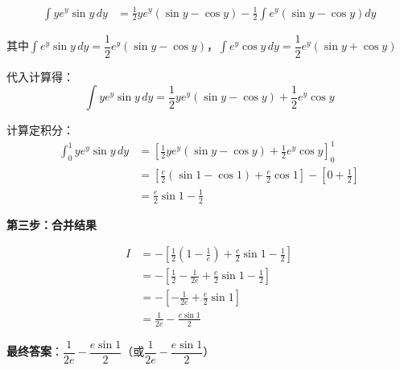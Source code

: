 \documentclass[standard]{ExBook}
\begin{document}
\begin{qitems}
\begin{bbox}
\begin{solution}
            \begin{align*}
            \int ye^y\sin y\, dy &= \frac{1}{2}ye^y(\sin y - \cos y) - \frac{1}{2}\int e^y(\sin y - \cos y)dy
            \end{align*}
            
            其中$\int e^y\sin y\, dy = \dfrac{1}{2}e^y(\sin y - \cos y)$，$\int e^y\cos y\, dy = \dfrac{1}{2}e^y(\sin y + \cos y)$
            
            代入计算得：
            $$\int ye^y\sin y\, dy = \frac{1}{2}ye^y(\sin y - \cos y) + \frac{1}{2}e^y\cos y$$
            
            计算定积分：
            \begin{align*}
            \int_0^1 ye^y\sin y\, dy &= \left[\frac{1}{2}ye^y(\sin y - \cos y) + \frac{1}{2}e^y\cos y\right]_0^1 \\
            &= \left[\frac{e}{2}(\sin 1 - \cos 1) + \frac{e}{2}\cos 1\right] - \left[0 + \frac{1}{2}\right] \\
            &= \frac{e}{2}\sin 1 - \frac{1}{2}
            \end{align*}
            
            \textbf{第三步：合并结果}
            
            \begin{align*}
            I &= -\left[\frac{1}{2}\left(1 - \frac{1}{e}\right) + \frac{e}{2}\sin 1 - \frac{1}{2}\right] \\
            &= -\left[\frac{1}{2} - \frac{1}{2e} + \frac{e}{2}\sin 1 - \frac{1}{2}\right] \\
            &= -\left[-\frac{1}{2e} + \frac{e}{2}\sin 1\right] \\
            &= \frac{1}{2e} - \frac{e\sin 1}{2}
            \end{align*}
            
            \textbf{最终答案}：$\dfrac{1}{2e} - \dfrac{e\sin 1}{2}$（或$\dfrac{1}{2e} - \dfrac{e\sin 1}{2}$）
        \end{solution}
    \end{bbox}

\end{qitems}
\end{document}
